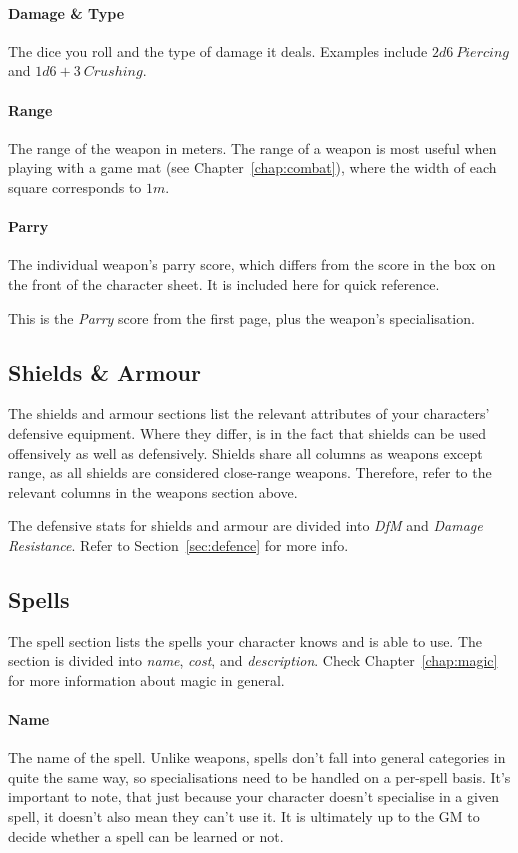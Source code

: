 \paragraph{Damage \& Type} The dice you roll and the type of damage it deals.
Examples include $2d6\ \mathit{Piercing}$ and $1d6+3\ \mathit{Crushing}$.

\paragraph{Range} The range of the weapon in meters.
The range of a weapon is most useful when playing with a game mat (see Chapter~\ref{chap:combat}), where the width of each square corresponds to $1m$.

\paragraph{Parry} The individual weapon's parry score, which differs from the score in the box on the front of the character sheet.
It is included here for quick reference.

This is the \textit{Parry} score from the first page, plus the weapon's specialisation.

\subsection{Shields \& Armour}
The shields and armour sections list the relevant attributes of your characters' defensive equipment.
Where they differ, is in the fact that shields can be used offensively as well as defensively.
Shields share all columns as weapons except range, as all shields are considered close-range weapons.
Therefore, refer to the relevant columns in the weapons section above.

The defensive stats for shields and armour are divided into \textit{DfM} and \textit{Damage Resistance}.
Refer to Section~\ref{sec:defence} for more info.

\subsection{Spells}
The spell section lists the spells your character knows and is able to use.
The section is divided into \textit{name}, \textit{cost}, and \textit{description}.
Check Chapter~\ref{chap:magic} for more information about magic in general.

\paragraph{Name} The name of the spell.
Unlike weapons, spells don't fall into general categories in quite the same way, so specialisations need to be handled on a per-spell basis.
It's important to note, that just because your character doesn't specialise in a given spell, it doesn't also mean they can't use it.
It is ultimately up to the GM to decide whether a spell can be learned or not.

